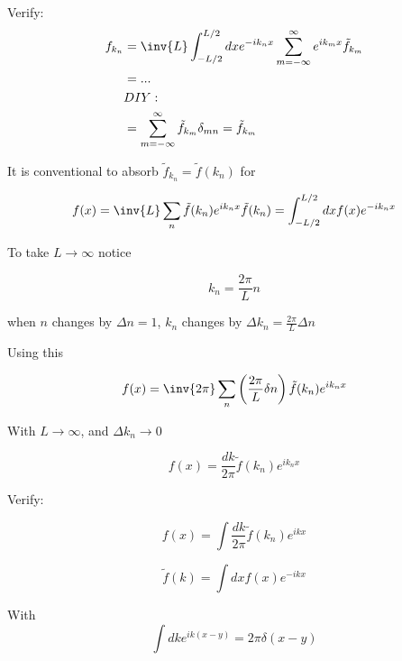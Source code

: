 Verify: 
\begin{align*}
f_{k_n} 
&= \inv{L} \int_{-L/2}^{L/2} dx e^{-i k_n x} \sum_{m=-\infty}^\infty e^{i k_m x} \tilde{f}_{k_m} \\
&= ...  \\
&DIY: \\
&= \sum_{m = -\infty}^\infty \tilde{f}_{k_m} \delta_{mn} = \tilde{f}_{k_m}
\end{align*}

It is conventional to absorb $\tilde{f}_{k_n} = \tilde{f}(k_n)$ for

\begin{equation}\label{eqn:relativisticElectrodynamicsL15:330}
f(x) = \inv{L} \sum_n \tilde{f}(k_n) e^{i k_n x}
\tilde{f}(k_n) = \int_{-L/2}^{L/2} dx f(x) e^{-i k_n x}
\end{equation}

To take $L \rightarrow \infty$ notice

\begin{equation}\label{eqn:relativisticElectrodynamicsL15:350}
k_n = \frac{2 \pi}{L} n
\end{equation}

when $n$ changes by $\Delta n = 1$, $k_n$ changes by $\Delta k_n = \frac{2 \pi}{L} \Delta n$

Using this 

\begin{equation}\label{eqn:relativisticElectrodynamicsL15:370}
f(x) = \inv{2\pi} \sum_n \left( \frac{2\pi}{L} \delta n \right) \tilde{f}(k_n) e^{i k_n x}
\end{equation}

With $L \rightarrow \infty$, and $\Delta k_n \rightarrow 0$

\begin{equation}\label{eqn:relativisticElectrodynamicsL15:390}
f(x) = \frac{dk}{2\pi} \tilde{f}(k_n) e^{i k_n x}
\end{equation}

Verify:

\begin{equation}\label{eqn:relativisticElectrodynamicsL15:410}
f(x) = \int \frac{dk}{2\pi} \tilde{f}(k_n) e^{i k x}
\end{equation}

\begin{equation}\label{eqn:relativisticElectrodynamicsL15:430}
\tilde{f}(k) = \int dx f(x) e^{-i k x}
\end{equation}

With
\begin{equation}\label{eqn:relativisticElectrodynamicsL15:450}
\int dk e^{i k (x - y)} = 2 \pi \delta(x - y)
\end{equation}

